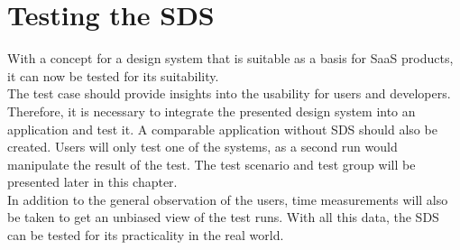 \newpage
\section{Testing the \acf{SDS}}
With a concept for a design system that is suitable as a basis for \ac{SaaS} products, it can now be tested for its suitability.  \\
The test case should provide insights into the usability for users and developers. Therefore, it is necessary to integrate the presented design system into an application and test it. A comparable application without SDS should also be created. Users will only test one of the systems, as a second run would manipulate the result of the test. The test scenario and test group will be presented later in this chapter. \\
In addition to the general observation of the users, time measurements will also be taken to get an unbiased view of the test runs. With all this data, the SDS can be tested for its practicality in the real world.


% 